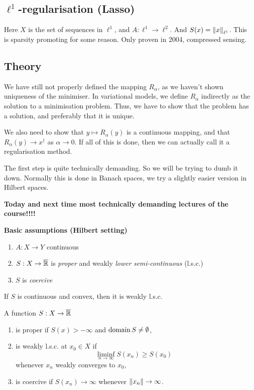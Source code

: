 \documentclass[12pt]{article}
\begin{document}
\subsection*{$\ell^1$-regularisation (Lasso)}
Here $X$ is the set of sequences in $\ell^1$, and $A:\ell^1\to\ell^2$. And $S(x) = \left\lVert x\right\rVert_{\ell^1}$. This is sparsity promoting for some reason. Only proven in 2004, compressed sensing. 

\subsection{Theory}
We have still not properly defined the mapping $R_\alpha$, as we haven't shown uniqueness of the minimiser. In variational models, we define $R_\alpha$ indirectly as the solution to a minimisation problem. Thus, we have to show that the problem has a solution, and preferably that it is unique. 

We also need to show that $y\mapsto R_\alpha(y)$ is a continuous mapping, and that $R_\alpha(y) \to x^\dagger $ as $\alpha\to 0$. If all of this is done, then we can actually call it a regularisation method.

The first step is quite technically demanding. So we will be trying to dumb it down. Normally this is done in Banach spaces, we try a slightly easier version in Hilbert spaces.

\textbf{Today and next time most technically demanding lectures of the course!!!!}

\textbf{Basic assumptions (Hilbert setting)}
\begin{enumerate}[label=(\alph*)]
    \item $A:X\to Y$ continuous
    \item $S:X\to\overline{\mathbb{R}}$ is \textit{proper} and weakly \textit{lower semi-continuous} (l.s.c.)
    \item $S$ is \textit{coercive}
\end{enumerate}
\begin{remark}
    If $S$ is continuous and convex, then it is weakly l.s.c.
\end{remark}

\begin{definition}
    A function $S:X\to\overline{\mathbb{R}}$ 
    \begin{enumerate}[label={(\alph*)}]
        \item is proper if $S(x)>-\infty$ and $\operatorname{domain} S\neq \emptyset$,
        \item is weakly l.s.c. at $x_0\in X$ if
        \begin{equation*}
            \liminf_{n\to\infty} S(x_n) \geq S(x_0)
        \end{equation*}
        whenever $x_n$ weakly converges to $x_0$,
        \item is coercive if $S(x_n)\to\infty$ whenever $\left\lVert x_n\right\rVert\to\infty$.
    \end{enumerate}
\end{definition}
\end{document}
